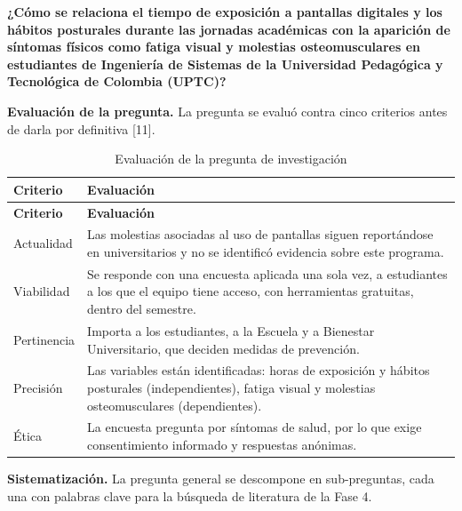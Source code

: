 \textbf{¿Cómo se relaciona el tiempo de exposición a pantallas digitales y los hábitos
posturales durante las jornadas académicas con la aparición de síntomas físicos como
fatiga visual y molestias osteomusculares en estudiantes de Ingeniería de Sistemas de la
Universidad Pedagógica y Tecnológica de Colombia (UPTC)?}


\bigskip
\noindent\textbf{Evaluación de la pregunta.} La pregunta se evaluó contra cinco criterios
antes de darla por definitiva [11].

\bigskip
\begin{center}
\begin{longtable}{L{2.6cm} L{12.2cm}}
\caption{Evaluación de la pregunta de investigación} \\
\toprule
\textbf{Criterio} & \textbf{Evaluación} \\
\midrule
\endfirsthead
\toprule
\textbf{Criterio} & \textbf{Evaluación} \\
\midrule
\endhead
Actualidad & Las molestias asociadas al uso de pantallas siguen reportándose en universitarios y no se identificó evidencia sobre este programa. \\
\midrule
Viabilidad & Se responde con una encuesta aplicada una sola vez, a estudiantes a los que el equipo tiene acceso, con herramientas gratuitas, dentro del semestre. \\
\midrule
Pertinencia & Importa a los estudiantes, a la Escuela y a Bienestar Universitario, que deciden medidas de prevención. \\
\midrule
Precisión & Las variables están identificadas: horas de exposición y hábitos posturales (independientes), fatiga visual y molestias osteomusculares (dependientes). \\
\midrule
Ética & La encuesta pregunta por síntomas de salud, por lo que exige consentimiento informado y respuestas anónimas. \\
\bottomrule
\end{longtable}
\end{center}

\bigskip
\noindent\textbf{Sistematización.} La pregunta general se descompone en sub-preguntas,
cada una con palabras clave para la búsqueda de literatura de la Fase 4.

